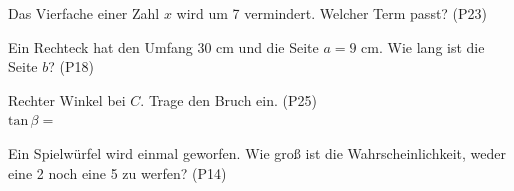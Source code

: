 \documentclass[11pt]{article}
\begin{document}
\begin{aufgabe}{Das Vierfache einer Zahl $x$ wird um 7 vermindert. Welcher Term passt? \hfill (P23) \\    }
\end{aufgabe}

\begin{aufgabe}{Ein Rechteck hat den Umfang $30$ cm und die Seite $a = 9$ cm. Wie lang ist die Seite $b$? \hfill (P18) \\ \leerfeld[cm]}
\end{aufgabe}

\begin{aufgabe}{\begin{minipage}[t]{0.6\linewidth}Rechter Winkel bei $C$. Trage den Bruch ein. \hfill (P25) \\ $\mathrm{tan}\,\beta =$ \leerfeld\end{minipage}\hfill\begin{minipage}[t]{0.37\linewidth}\vspace{0pt}
\end{minipage}}
\end{aufgabe}

\begin{aufgabe}{Ein Spielwürfel wird einmal geworfen. Wie groß ist die Wahrscheinlichkeit, weder eine 2 noch eine 5 zu werfen? \hfill (P14) \\ \leerfeld}
\end{aufgabe}

\begleitteil
{}
\end{document}
